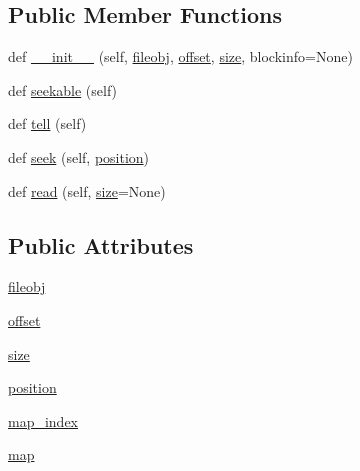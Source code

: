 \subsection*{Public Member Functions}
\begin{DoxyCompactItemize}
\item 
def \hyperlink{classpip_1_1__vendor_1_1distlib_1_1__backport_1_1tarfile_1_1__FileInFile_aca7e26d20554dff7cfbc8619d57877ec}{\+\_\+\+\_\+init\+\_\+\+\_\+} (self, \hyperlink{classpip_1_1__vendor_1_1distlib_1_1__backport_1_1tarfile_1_1__FileInFile_a4ccf45d1ca1cd53195447e2497666439}{fileobj}, \hyperlink{classpip_1_1__vendor_1_1distlib_1_1__backport_1_1tarfile_1_1__FileInFile_a84fdc52244c1a20c929e8fa8854aa534}{offset}, \hyperlink{classpip_1_1__vendor_1_1distlib_1_1__backport_1_1tarfile_1_1__FileInFile_a810284799035bb60f26e640c38bbd9dd}{size}, blockinfo=None)
\item 
def \hyperlink{classpip_1_1__vendor_1_1distlib_1_1__backport_1_1tarfile_1_1__FileInFile_ad23471358e1f8da99c20a1497e0a89ef}{seekable} (self)
\item 
def \hyperlink{classpip_1_1__vendor_1_1distlib_1_1__backport_1_1tarfile_1_1__FileInFile_aeddacf4c7a064aac77aac0a864e0211d}{tell} (self)
\item 
def \hyperlink{classpip_1_1__vendor_1_1distlib_1_1__backport_1_1tarfile_1_1__FileInFile_a441f0f70ba08106737e7fcc1cc0dfec4}{seek} (self, \hyperlink{classpip_1_1__vendor_1_1distlib_1_1__backport_1_1tarfile_1_1__FileInFile_a1669f7184dec51ff2bae80e07e3d02e9}{position})
\item 
def \hyperlink{classpip_1_1__vendor_1_1distlib_1_1__backport_1_1tarfile_1_1__FileInFile_a107777141f82afab269567b82a35bac2}{read} (self, \hyperlink{classpip_1_1__vendor_1_1distlib_1_1__backport_1_1tarfile_1_1__FileInFile_a810284799035bb60f26e640c38bbd9dd}{size}=None)
\end{DoxyCompactItemize}
\subsection*{Public Attributes}
\begin{DoxyCompactItemize}
\item 
\hyperlink{classpip_1_1__vendor_1_1distlib_1_1__backport_1_1tarfile_1_1__FileInFile_a4ccf45d1ca1cd53195447e2497666439}{fileobj}
\item 
\hyperlink{classpip_1_1__vendor_1_1distlib_1_1__backport_1_1tarfile_1_1__FileInFile_a84fdc52244c1a20c929e8fa8854aa534}{offset}
\item 
\hyperlink{classpip_1_1__vendor_1_1distlib_1_1__backport_1_1tarfile_1_1__FileInFile_a810284799035bb60f26e640c38bbd9dd}{size}
\item 
\hyperlink{classpip_1_1__vendor_1_1distlib_1_1__backport_1_1tarfile_1_1__FileInFile_a1669f7184dec51ff2bae80e07e3d02e9}{position}
\item 
\hyperlink{classpip_1_1__vendor_1_1distlib_1_1__backport_1_1tarfile_1_1__FileInFile_a29934eb7762016886fde3bf17b23fd94}{map\+\_\+index}
\item 
\hyperlink{classpip_1_1__vendor_1_1distlib_1_1__backport_1_1tarfile_1_1__FileInFile_a2e6d819a64aba3822974f515e0595d50}{map}
\end{DoxyCompactItemize}



